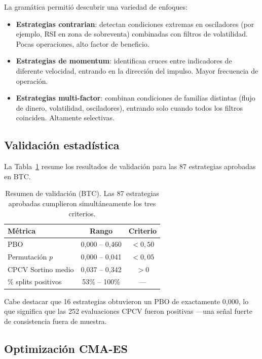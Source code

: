 \documentclass[12pt,a4paper]{article}
\begin{document}
La gramática permitió descubrir una variedad de enfoques:

\begin{itemize}
\item \textbf{Estrategias contrarian}: detectan condiciones extremas en osciladores
  (por ejemplo, RSI en zona de sobreventa) combinadas con filtros de volatilidad.
  Pocas operaciones, alto factor de beneficio.

\item \textbf{Estrategias de momentum}: identifican cruces entre indicadores de
  diferente velocidad, entrando en la dirección del impulso. Mayor frecuencia
  de operación.

\item \textbf{Estrategias multi-factor}: combinan condiciones de familias distintas
  (flujo de dinero, volatilidad, osciladores), entrando solo cuando todos los
  filtros coinciden. Altamente selectivas.
\end{itemize}

\subsection{Validación estadística}

La Tabla~\ref{tab:validation} resume los resultados de validación para las 87
estrategias aprobadas en BTC.

\begin{table}[H]
\centering
\caption{Resumen de validación (BTC). Las 87 estrategias aprobadas cumplieron
simultáneamente los tres criterios.}
\label{tab:validation}
\begin{tabular}{lcc}
\toprule
\textbf{Métrica} & \textbf{Rango} & \textbf{Criterio} \\
\midrule
PBO & 0,000 -- 0,460 & $< 0{,}50$ \\
Permutación $p$ & 0,000 -- 0,041 & $< 0{,}05$ \\
CPCV Sortino medio & 0,037 -- 0,342 & $> 0$ \\
\% splits positivos & 53\% -- 100\% & --- \\
\bottomrule
\end{tabular}
\end{table}

Cabe destacar que 16 estrategias obtuvieron un PBO de exactamente 0,000, lo que
significa que las 252 evaluaciones CPCV fueron positivas ---una señal fuerte de
consistencia fuera de muestra.

\subsection{Optimización CMA-ES}
\end{document}

